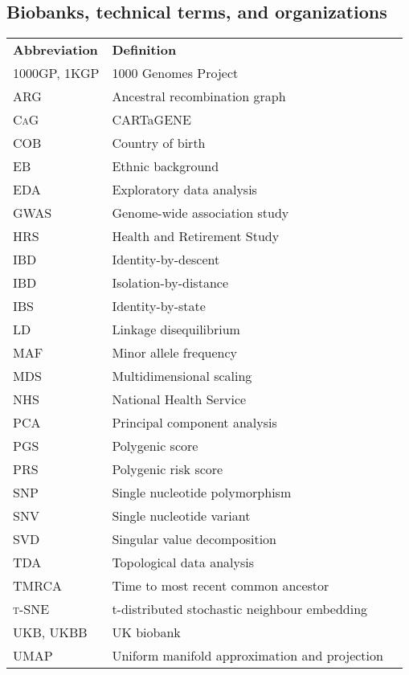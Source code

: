 
\subsection*{Biobanks, technical terms, and organizations}

\begin{table}[!h]
\hspace{1.0cm}
\begin{tabular}{l l r}

\textbf{Abbreviation} & \textbf{Definition} \\ [1ex]
\textsc{1000GP, 1KGP}  &  1000 Genomes Project \\ [1ex]
\textsc{ARG}  &  Ancestral recombination graph \\ [1ex]
\textsc{CaG}  &  CARTaGENE \\ [1ex]
\textsc{COB}  &  Country of birth \\ [1ex]
\textsc{EB}  &  Ethnic background \\ [1ex]
\textsc{EDA}  &  Exploratory data analysis \\ [1ex]
\textsc{GWAS}  &  Genome-wide association study \\ [1ex]
\textsc{HRS}  &  Health and Retirement Study \\ [1ex]
\textsc{IBD}  &  Identity-by-descent \\ [1ex]
\textsc{IBD}  &  Isolation-by-distance \\ [1ex]
\textsc{IBS}  &  Identity-by-state \\ [1ex]
\textsc{LD}  &  Linkage disequilibrium \\ [1ex]
\textsc{MAF}  &  Minor allele frequency \\ [1ex]
\textsc{MDS}  &  Multidimensional scaling \\ [1ex]
\textsc{NHS}  &  National Health Service \\ [1ex]
\textsc{PCA}  & Principal component analysis \\ [1ex]
\textsc{PGS}  &  Polygenic score \\ [1ex]
\textsc{PRS}  &  Polygenic risk score \\ [1ex]
\textsc{SNP}  &  Single nucleotide polymorphism \\ [1ex]
\textsc{SNV}  &  Single nucleotide variant \\ [1ex]
\textsc{SVD}  &  Singular value decomposition \\ [1ex]
\textsc{TDA}  &  Topological data analysis \\ [1ex]
\textsc{TMRCA}  &  Time to most recent common ancestor \\ [1ex]
\textsc{{t}-SNE}  &  t-distributed stochastic neighbour embedding \\ [1ex]
\textsc{UKB, UKBB}  &  UK biobank \\ [1ex]
\textsc{UMAP}  &  Uniform manifold approximation and projection \\ [1ex]

\end{tabular}
\end{table}


